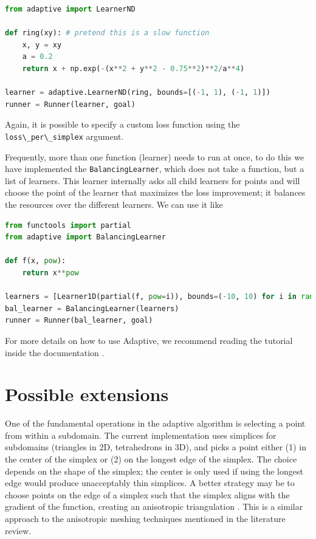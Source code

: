 \begin{lstlisting}[language=Python]
from adaptive import LearnerND

def ring(xy): # pretend this is a slow function
    x, y = xy
    a = 0.2
    return x + np.exp(-(x**2 + y**2 - 0.75**2)**2/a**4)

learner = adaptive.LearnerND(ring, bounds=[(-1, 1), (-1, 1)])
runner = Runner(learner, goal)
\end{lstlisting}

Again, it is possible to specify a custom loss function using the \passthrough{\lstinline!loss\_per\_simplex!} argument.


Frequently, more than one function (learner) needs to run at once, to do this we have implemented the \passthrough{\lstinline!BalancingLearner!}, which does not take a function, but a list of learners.
This learner internally asks all child learners for points and will choose the point of the learner that maximizes the loss improvement; it balances the resources over the different learners.
We can use it like

\begin{lstlisting}[language=Python]
from functools import partial
from adaptive import BalancingLearner

def f(x, pow):
    return x**pow

learners = [Learner1D(partial(f, pow=i)), bounds=(-10, 10) for i in range(2, 10)]
bal_learner = BalancingLearner(learners)
runner = Runner(bal_learner, goal)
\end{lstlisting}

For more details on how to use Adaptive, we recommend reading the tutorial inside the documentation \cite{Nijholt2018}.

\section{Possible extensions}


One of the fundamental operations in the adaptive algorithm is selecting a point from within a subdomain.
The current implementation uses simplices for subdomains (triangles in 2D, tetrahedrons in 3D), and picks a point either (1) in the center of the simplex or (2) on the longest edge of the simplex.
The choice depends on the shape of the simplex; the center is only used if using the longest edge would produce unacceptably thin simplices.
A better strategy may be to choose points on the edge of a simplex such that the simplex aligns with the gradient of the function, creating an anisotropic triangulation \cite{Dyn1990}.
This is a similar approach to the anisotropic meshing techniques mentioned in the literature review.

